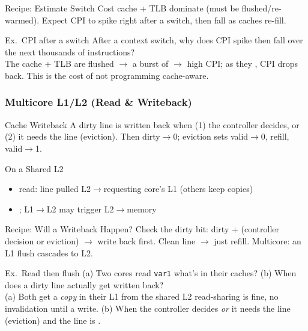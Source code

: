 \begin{KR}{Recipe: Estimate Switch Cost}
    cache + TLB dominate (must be flushed/re-warmed). Expect CPI to spike right after a switch, then fall as caches re-fill.
\end{KR}

\multend

\begin{example2}{Ex.\ CPI after a switch}
    After a context switch, why does CPI spike then fall over the next thousands of instructions?
     \\ 
    The cache + TLB are flushed $\to$ a burst of  $\to$ high CPI; as they , CPI drops back. This is the cost of not programming cache-aware.
\end{example2}

\subsubsection{Multicore L1/L2 (Read \& Writeback)}


\begin{definition}{Cache Writeback}
    A dirty line is written back when (1) the controller decides, or (2) it needs the line (eviction). Then dirty$\to$0; eviction sets valid$\to$0, refill, valid$\to$1.
\end{definition}

\begin{concept}{On a Shared L2}
    \begin{itemize}
        \item read: line pulled L2$\to$requesting core's L1 (others keep copies)
        \item {}; L1$\to$L2 may trigger L2$\to$memory
    \end{itemize}
\end{concept}



\begin{KR}{Recipe: Will a Writeback Happen?}
    Check the dirty bit: dirty + (controller decision or eviction) $\to$ write back first. Clean line $\to$ just refill. Multicore: an L1 flush cascades to L2.
\end{KR}

\begin{example2}{Ex.\ Read then flush}
    (a) Two cores read \texttt{var1} what's in their caches? (b) When does a dirty line actually get written back?
     \\ 
    (a) Both get a \emph{copy} in their L1 from the shared L2 read-sharing is fine, no invalidation until a write. (b) When the controller decides \emph{or} it needs the line (eviction) and the line is .
\end{example2}

